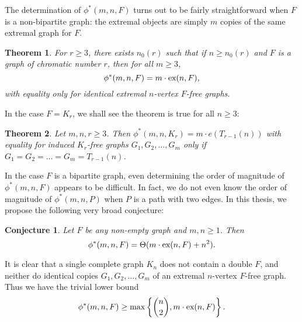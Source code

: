 \documentclass[12pt]{article}
\newcounter{foo}
\newtheorem{theorem}{Theorem}
\newtheorem{conjecture}{Conjecture}[foo]
\newcommand*{\ex}{\textnormal{ex}}
\begin{document}
The determination of $\phi^*(m, n, F)$ turns out to be fairly straightforward when $F$ is a non-bipartite graph: the extremal objects are simply $m$ copies of the same extremal graph for $F$.

\begin{theorem}\label{thm:inducedF}
  For $r \geq 3$, there exists $n_0(r)$ such that if $n \geq n_0(r)$ and $F$ is a graph of chromatic number $r$, then for all $m \geq 3$,    
  \[
    \phi^*(m, n, F) = m \cdot \ex(n, F),
  \]
  with equality only for identical extremal $n$-vertex $F$-free graphs.
\end{theorem}

In the case $F = K_r$, we shall see the theorem is true for all $n \geq 3$:

\begin{theorem}\label{thm:complete}
Let $m, n, r \geq 3$. Then $\phi^*(m, n, K_{r}) = m \cdot e(T_{r - 1}(n))$ with equality for induced $K_{r}$-free graphs $G_1, G_2, \dots, G_m$ only if $G_1 = G_2 = \dots = G_m = T_{r - 1}(n)$.  
\end{theorem}

In the case $F$ is a bipartite graph, even determining the order of magnitude of $\phi^*(m, n, F)$ appears to be difficult. In fact, we do not even know the order of magnitude of $\phi^*(m, n, P)$ when $P$ is a path with two edges. In this thesis, we propose the following very broad conjecture:

\begin{conjecture}\label{conj:main}
Let $F$ be any non-empty graph and $m, n \geq 1$. Then 
\[ 
  \phi^*(m, n, F) = \Theta(m \cdot \ex(n, F) + n^2).
\]
\end{conjecture}

It is clear that a single complete graph $K_n$ does not contain a double $F$, and neither do identical copies $G_1, G_2, \dots, G_m$ of an extremal $n$-vertex $F$-free graph. Thus we have the trivial lower bound 
\[ 
  \phi^*(m, n, F) \geq \max\left\{\binom{n}{2}, m \cdot \ex(n, F)\right\}.
\]
\end{document}

